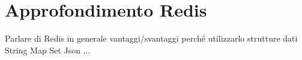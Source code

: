 \chapter{Approfondimento Redis}
Parlare di Redis in generale
vantaggi/svantaggi
perché utilizzarlo
strutture dati
String
Map
Set
Json
...
